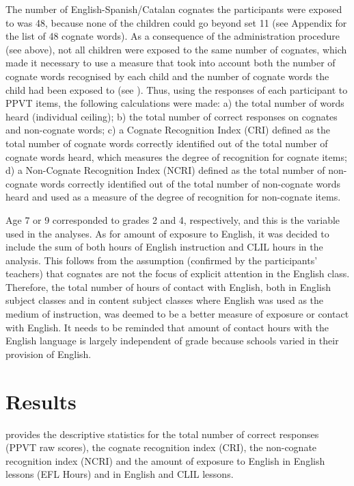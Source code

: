 \documentclass[output=paper,modfonts,nonflat,newtxmath]{langsci/langscibook}
\begin{document}
The number of English-Spanish/Catalan cognates the participants were exposed to was 48, because none of the children could go beyond set 11 (see Appendix for the list of 48 cognate words). As a consequence of the administration procedure (see above), not all children were exposed to the same number of cognates, which made it necessary to use a measure that took into account both the number of cognate words recognised by each child and the number of cognate words the child had been exposed to (see \citealt{MuñozEtAl2018}). Thus, using the responses of each participant to PPVT items, the following calculations were made: a) the total number of words heard (individual ceiling); b) the total number of correct responses on cognates and non-cognate words; c) a Cognate Recognition Index (CRI) defined as the total number of cognate words correctly identified out of the total number of cognate words heard, which measures the degree of recognition for cognate items; d) a Non-Cognate Recognition Index (NCRI) defined as the total number of non-cognate words correctly identified out of the total number of non-cognate words heard and used as a measure of the degree of recognition for non-cognate items.

Age 7 or 9 corresponded to grades 2 and 4, respectively, and this is the variable used in the analyses. As for amount of exposure to English, it was decided to include the sum of both hours of English instruction and CLIL hours in the analysis. This follows from the assumption (confirmed by the participants’ teachers) that cognates are not the focus of explicit attention in the English class. Therefore, the total number of hours of contact with English, both in English subject classes and in content subject classes where English was used as the medium of instruction, was deemed to be a better measure of exposure or contact with English. It needs to be reminded that amount of contact hours with the English language is largely independent of grade because schools varied in their provision of English.


\section{Results}\label{sec:munoz:4}

 provides the descriptive statistics for the total number of correct responses (PPVT raw scores), the cognate recognition index (CRI), the non-cognate recognition index (NCRI) and the amount of exposure to English in English lessons (EFL Hours) and in English and CLIL lessons.
\end{document}
